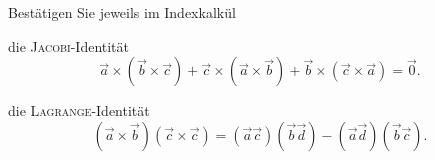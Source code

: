 \begin{atiTask}[
  title = Die Identitäten von JACOBI und LAGRANGE
]
Bestätigen Sie jeweils im Indexkalkül
\begin{atiSubtasks}
\item die \textsc{Jacobi}-Identität
\[\vec{a}\times (\vec{b}\times \vec{c})+\vec{c}\times (\vec{a}\times \vec{b})+\vec{b}\times (\vec{c}\times \vec{a})=\vec{0}.
\]
\item die \textsc{Lagrange}-Identität
\[(\vec{a}\times \vec{b})(\vec{c}\times \vec{c})=(\vec{a}\vec{c})(\vec{b}\vec{d})-(\vec{a}\vec{d})(\vec{b}\vec{c}).
\]
\end{atiSubtasks}



\end{atiTask}